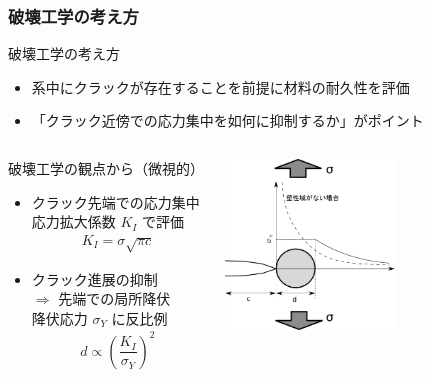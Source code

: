 \documentclass[11pt, dvipdfmx]{beamer}
\begin{document}
\begin{frame}
\frametitle{破壊工学の考え方}
\begin{exampleblock}{破壊工学の考え方}

\begin{itemize}
\item
系中にクラックが存在することを前提に材料の耐久性を評価
\item
\alert{「クラック近傍での応力集中を如何に抑制するか」}がポイント
\end{itemize}
\end{exampleblock}

\begin{columns}[totalwidth=1\textwidth]
\begin{alertblock}{破壊工学の観点から（微視的）}
	\begin{itemize}
		\item
		クラック先端での応力集中\\ \alert{応力拡大係数 $K_I$ で評価}
		\footnotesize
		\begin{align*}
		K_{I} = \sigma \sqrt{\pi c}
		\end{align*}
		\normalsize
		\item 
		クラック進展の抑制 \\
		$\Rightarrow$ 先端での\alert{局所降伏}\\
		降伏応力 $\sigma_Y$ に反比例
		\footnotesize
		\begin{align*}
		d \propto \left( \dfrac{K_I}{\sigma_Y} \right)^2
		\end{align*}
		\normalsize
	\end{itemize}
\end{alertblock}
	\centering
	\includegraphics[width=45mm]{./fig/Crack_Yield.pdf}
\end{columns}

\end{frame}

\end{document}
